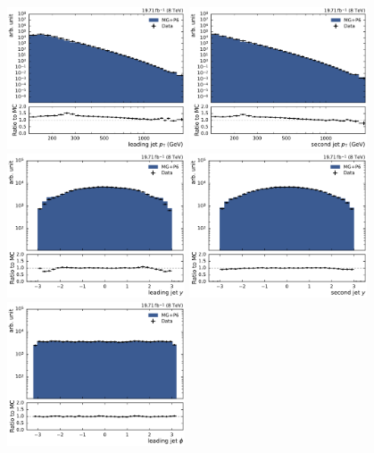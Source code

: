 \begin{figure}[htbp]
    \centering
    \includegraphics[width=0.47\textwidth]{figures/measurement/jet_quantities_jet1pt.pdf}\hfill
    \includegraphics[width=0.47\textwidth]{figures/measurement/jet_quantities_jet2pt.pdf}
    \includegraphics[width=0.47\textwidth]{figures/measurement/jet_quantities_jet1rap.pdf}\hfill
    \includegraphics[width=0.47\textwidth]{figures/measurement/jet_quantities_jet2rap.pdf}
    \includegraphics[width=0.47\textwidth]{figures/measurement/jet_quantities_jet1phi.pdf}\hfill

\end{figure}
